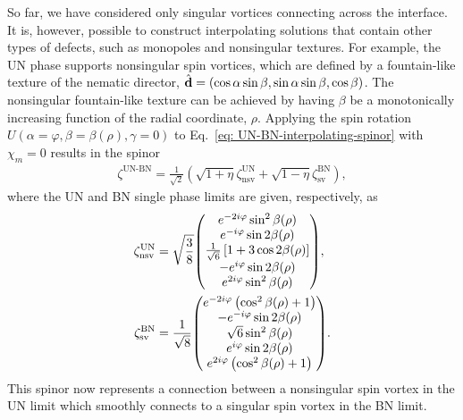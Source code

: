 So far, we have considered only singular vortices connecting across the
interface.
It is, however, possible to construct interpolating solutions that contain
other types of defects, such as monopoles and nonsingular textures.
For example, the UN phase supports nonsingular spin vortices, which are defined
by a fountain-like texture of the nematic director, \(\hat{\vb{d}} =
(\cos\alpha\sin\beta, \sin\alpha\sin\beta, \cos\beta)\).
The nonsingular fountain-like texture can be achieved by having \(\beta\) be a
monotonically increasing function of the radial coordinate, \(\rho\).
Applying the spin rotation \(U(\alpha=\varphi, \beta=\beta(\rho), \gamma=0)\) to
Eq.~\eqref{eq: UN-BN-interpolating-spinor} with \(\chi_m=0\) results in the
spinor
\begin{align}\label{eq: UN-BN-nsv-sv}
    \zeta^\text{UN-BN}=\frac{1}{\sqrt{2}}\left(
        \sqrt{1+\eta}\zeta^\text{UN}_\text{nsv} + 
        \sqrt{1-\eta}\zeta^\text{BN}_\text{sv}
        \right),
\end{align}
where the UN and BN single phase limits are given, respectively, as
\begin{align}\label{eq: UN-general}
    \zeta^\text{UN}_\text{nsv} &= \sqrt{\frac{3}{8}}
    \mqty(
        e^{-2i\varphi}\sin^2\beta(\rho) \\
        e^{-i\varphi}\sin 2 \beta(\rho) \\
        \frac{1}{\sqrt{6}}\left[1+3\cos 2\beta(\rho)\right] \\
        -e^{i\varphi} \sin 2 \beta(\rho) \\
        e^{2i\varphi}\sin^2\beta(\rho)
    ), \\
    \zeta^\text{BN}_\text{sv} &= \frac{1}{\sqrt{8}} \label{eq: BN-general}
    \mqty(
        e^{-2i\varphi}\left(\cos^2\beta(\rho) + 1\right) \\
        - e^{-i\varphi}\sin 2 \beta(\rho) \\
        \sqrt{6}\sin^2\beta(\rho) \\
        e^{i\varphi}\sin 2 \beta(\rho) \\
        e^{2i\varphi}\left(\cos^2\beta(\rho) + 1\right)          
    ).
\end{align}
This spinor now represents a connection between a nonsingular spin vortex in the
UN limit which smoothly connects to a singular spin vortex in the BN limit.

